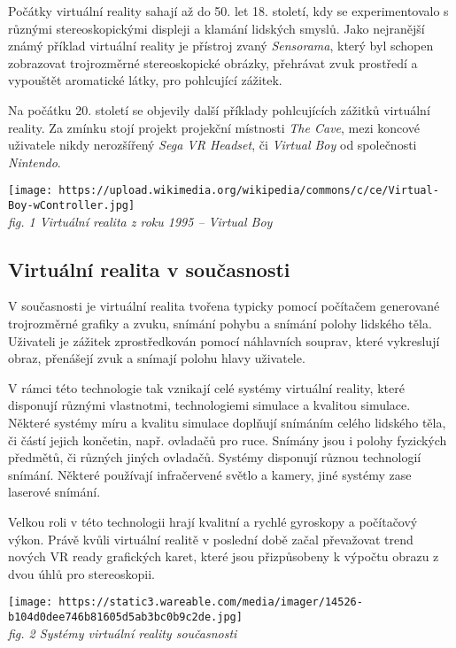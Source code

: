Počátky virtuální reality sahají až do 50. let 18. století, kdy se
experimentovalo s různými stereoskopickými displeji a klamání lidských
smyslů. Jako nejranější známý příklad virtuální reality je přístroj
zvaný \emph{Sensorama}, který byl schopen zobrazovat trojrozměrné
stereoskopické obrázky, přehrávat zvuk prostředí a vypouštět aromatické
látky, pro pohlcující zážitek.

Na počátku 20. století se objevily další příklady pohlcujících zážitků
virtuální reality. Za zmínku stojí projekt projekční místnosti \emph{The
Cave}, mezi koncové uživatele nikdy nerozšířený \emph{Sega VR Headset},
či \emph{Virtual Boy} od společnosti \emph{Nintendo}.

\texttt{[image: https://upload.wikimedia.org/wikipedia/commons/c/ce/Virtual-Boy-wController.jpg]}\\
\emph{fig. 1 Virtuální realita z roku 1995 -- Virtual Boy}

\subsection{Virtuální realita v
současnosti}\label{virtuuxe1lnuxed-realita-v-souux10dasnosti}

V současnosti je virtuální realita tvořena typicky pomocí počítačem
generované trojrozměrné grafiky a zvuku, snímání pohybu a snímání polohy
lidského těla. Uživateli je zážitek zprostředkován pomocí náhlavních
souprav, které vykreslují obraz, přenášejí zvuk a snímají polohu hlavy
uživatele.

V rámci této technologie tak vznikají celé systémy virtuální reality,
které disponují různými vlastnotmi, technologiemi simulace a kvalitou
simulace. Některé systémy míru a kvalitu simulace doplňují snímáním
celého lidského těla, či částí jejich končetin, např. ovladačů pro ruce.
Snímány jsou i polohy fyzických předmětů, či různých jiných ovladačů.
Systémy disponují různou technologií snímání. Některé používají
infračervené světlo a kamery, jiné systémy zase laserové snímání.

Velkou roli v této technologii hrají kvalitní a rychlé gyroskopy a
počítačový výkon. Právě kvůli virtuální realitě v poslední době začal
převažovat trend nových VR ready grafických karet, které jsou
přizpůsobeny k výpočtu obrazu z dvou úhlů pro stereoskopii.

\texttt{[image: https://static3.wareable.com/media/imager/14526-b104d0dee746b81605d5ab3bc0b9c2de.jpg]}\\
\emph{fig. 2 Systémy virtuální reality současnosti}

